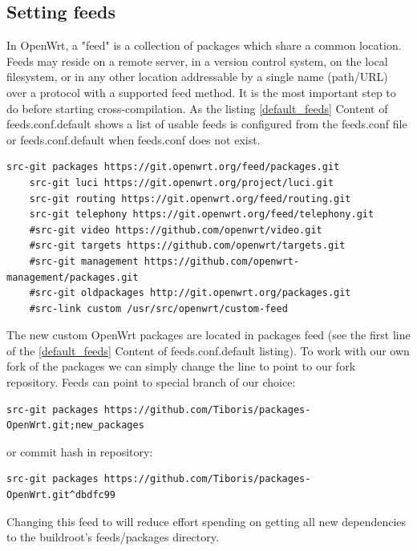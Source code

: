 \subsection{Setting feeds}

In OpenWrt, a "feed" is a collection of packages which share a common location.
Feeds may reside on a remote server, in a version control system, on the local filesystem, or in any other location addressable by a single name (path/URL) over a protocol with a supported feed method.
It is the most important step to do before starting cross-compilation.
As the listing \ref{default_feeds} Content of feeds.conf.default shows a list of usable feeds is configured from the feeds.conf file or feeds.conf.default when feeds.conf does not exist.

\begin{lstlisting}[columns=fixed,basicstyle=\ttfamily\footnotesize,tabsize=4,label=default_feeds,caption=Content of feeds.conf.default]
    src-git packages https://git.openwrt.org/feed/packages.git
    src-git luci https://git.openwrt.org/project/luci.git
    src-git routing https://git.openwrt.org/feed/routing.git
    src-git telephony https://git.openwrt.org/feed/telephony.git
    #src-git video https://github.com/openwrt/video.git
    #src-git targets https://github.com/openwrt/targets.git
    #src-git management https://github.com/openwrt-management/packages.git
    #src-git oldpackages http://git.openwrt.org/packages.git
    #src-link custom /usr/src/openwrt/custom-feed
\end{lstlisting}

The new custom OpenWrt packages are located in packages feed (see the first line of the \ref{default_feeds} Content of feeds.conf.default listing).
To work with our own fork of the packages we can simply change the line to point to our fork repository.
Feeds can point to special branch of our choice:
\begin{lstlisting}[columns=fixed,basicstyle=\ttfamily\footnotesize,tabsize=4,backgroundcolor=\color{yellow!10}]
src-git packages https://github.com/Tiboris/packages-OpenWrt.git;new_packages
\end{lstlisting}
or commit hash in repository:
\begin{lstlisting}[columns=fixed,basicstyle=\ttfamily\footnotesize,tabsize=4,backgroundcolor=\color{yellow!10}]
src-git packages https://github.com/Tiboris/packages-OpenWrt.git^dbdfc99
\end{lstlisting}
Changing this feed to will reduce effort spending on getting all new dependencies to the buildroot's feeds/packages directory.

